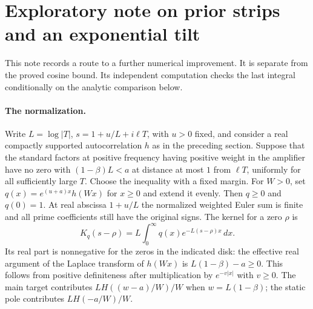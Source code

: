 \section{Exploratory note on prior strips and an exponential tilt}
This note records a route to a further numerical improvement. It is
separate from the proved cosine bound. Its independent computation
checks the last integral conditionally on the analytic comparison below.

\paragraph{The normalization.}
Write $L=\log|T|$, $s=1+u/L+i\ell T$, with $u>0$ fixed, and consider a
real compactly supported autocorrelation $h$ as in the preceding section.
Suppose that the standard factors at positive frequency having positive
weight in the amplifier have no zero with
$(1-\beta)L<a$ at distance at most $1$ from $\ell T$, uniformly for
all sufficiently large $T$. Choose the inequality with a fixed margin.
For $W>0$, set
$q(x)=e^{(u+a)x}h(Wx)$ for $x\ge0$ and extend it evenly.
Then $q\ge0$ and $q(0)=1$. At real abscissa $1+u/L$ the normalized
weighted Euler sum is finite and all prime coefficients still have the
original signs. The kernel for a zero $\rho$ is
\[
 K_q(s-\rho)= L\int_0^\infty q(x)e^{-L(s-\rho)x}\,dx .
\]
Its real part is nonnegative for the zeros in the indicated disk:
the effective real argument of the Laplace transform of $h(Wx)$ is
$L(1-\beta)-a\ge0$. This follows from positive definiteness after
multiplication by $e^{-v|x|}$ with $v\ge0$. The main target contributes
$L H((w-a)/W)/W$ when $w=L(1-\beta)$; the static pole contributes
$L H(-a/W)/W$.


